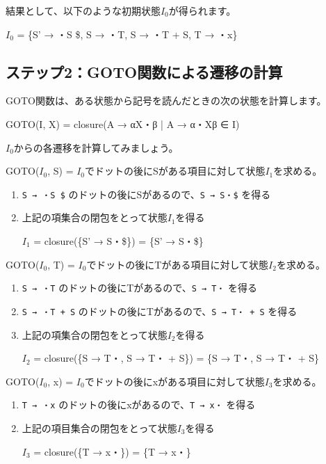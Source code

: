 結果として、以下のような初期状態\(I_0\)が得られます。

\(I_0\) = \{S' → ・S \$, S → ・T, S → ・T + S, T → ・x\}

\subsection{ステップ2：GOTO関数による遷移の計算}

GOTO関数は、ある状態から記号を読んだときの次の状態を計算します。

\begin{codescreen}{}
GOTO(I, X) = closure({A → αX・β | A → α・Xβ ∈ I})
\end{codescreen}

\(I_0\)からの各遷移を計算してみましょう。

GOTO(\(I_0\), S) =
\(I_0\)でドットの後にSがある項目に対して状態\(I_1\)を求める。

\begin{enumerate}
\item
  \texttt{S\textquotesingle{}\ →\ ・S\ \$}
  のドットの後にSがあるので、\texttt{S\textquotesingle{}\ →\ S・\$}
  を得る
\item
  上記の項集合の閉包をとって状態\(I_1\)を得る

  \(I_1\) = closure(\{S' → S・\$\}) = \{S' → S・\$\}
\end{enumerate}

GOTO(\(I_0\), T) =
\(I_0\)でドットの後にTがある項目に対して状態\(I_2\)を求める。

\begin{enumerate}
\item
  \texttt{S\ →\ ・T} のドットの後にTがあるので、\texttt{S\ →\ T・}
  を得る
\item
  \texttt{S\ →\ ・T\ +\ S}
  のドットの後にTがあるので、\texttt{S\ →\ T・\ +\ S} を得る
\item
  上記の項集合の閉包をとって状態\(I_2\)を得る

  \(I_2\) = closure(\{S → T・, S → T・ + S\}) = \{S → T・, S → T・ + S\}
\end{enumerate}

GOTO(\(I_0\), x) =
\(I_0\)でドットの後にxがある項目に対して状態\(I_3\)を求める。

\begin{enumerate}
\item
  \texttt{T\ →\ ・x} のドットの後にxがあるので、\texttt{T\ →\ x・}
  を得る
\item
  上記の項目集合の閉包をとって状態\(I_3\)を得る

  \(I_3\) = closure(\{T → x・\}) = \{T → x・\}
\end{enumerate}

